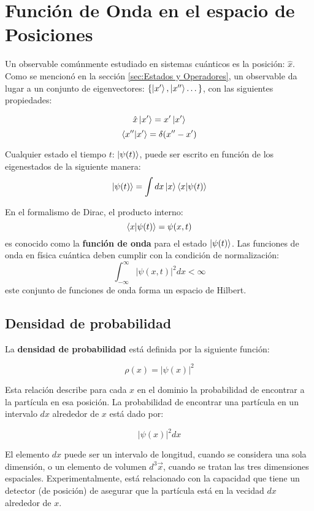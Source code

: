 \section{Función de Onda en el espacio de Posiciones}
Un observable comúnmente estudiado en sistemas cuánticos es la posición: $\hat{x}$. Como se mencionó en la sección \autoref{sec:Estados y Operadores}, un observable da lugar a un conjunto de eigenvectores: $\{\ket{x'}, \ket{x''}\dots \}$, con las siguientes propiedades:

$$\hat{x}\ket{x'} = x'\ket{x'}$$
$$\bra{x''}\ket{x'}=\delta(x''-x')$$

Cualquier estado el tiempo $t$: $\ket{\psi(t)}$, puede ser escrito en función de los eigenestados de la siguiente manera:
$$\ket{\psi(t)} = \int dx\ket{x}\bra{x}\ket{\psi(t)}$$

En el formalismo de Dirac, el producto interno:
$$\bra{x}\ket{\psi(t)} = \psi(x,t)$$
es conocido como la \textbf{función de onda} para el estado $\ket{\psi(t)}$. Las funciones de onda en física cuántica deben cumplir con la condición de normalización:
$$\int_{-\infty}^{\infty}| \psi(x,t)|^2dx < \infty $$
este conjunto de funciones de onda forma un espacio de Hilbert.

\subsection{Densidad de probabilidad}

La \textbf{densidad de probabilidad} está definida por la siguiente función:

\begin{equation}
 \label{eq:density probablity}
\rho(x)=|\psi(x)|^2
\end{equation}

Esta relación describe para cada $x$ en el dominio la probabilidad de encontrar a la partícula en esa posición. La probabilidad de encontrar una partícula en un intervalo $dx$ alrededor de $x$ está dado por:

 $$|\psi(x)|^2 dx $$

 El elemento $dx$ puede ser un intervalo de longitud, cuando se considera una sola dimensión, o un elemento de volumen $d^3\vec{x}$, cuando se tratan las tres dimensiones espaciales. Experimentalmente, está relacionado con la capacidad que tiene un detector (de posición) de asegurar que la partícula está en la vecidad $dx$ alrededor de $x$.




